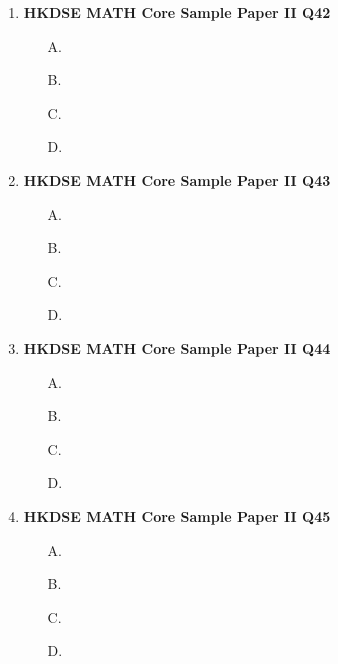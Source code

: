\documentclass[12pt]{article}
\begin{document}
\begin{enumerate}
	\item \textbf{HKDSE MATH Core Sample Paper II Q42}\\
	\begin{enumerate}
		\item[A.]
		\item[B.]
		\item[C.]
		\item[D.]
	\end{enumerate}
	\item \textbf{HKDSE MATH Core Sample Paper II Q43}\\
	\begin{enumerate}
		\item[A.]
		\item[B.]
		\item[C.]
		\item[D.]
	\end{enumerate}
	\item \textbf{HKDSE MATH Core Sample Paper II Q44}\\
	\begin{enumerate}
		\item[A.]
		\item[B.]
		\item[C.]
		\item[D.]
	\end{enumerate}
	\item \textbf{HKDSE MATH Core Sample Paper II Q45}\\
	\begin{enumerate}
		\item[A.]
		\item[B.]
		\item[C.]
		\item[D.]
	\end{enumerate}

\end{enumerate}
\end{document}
